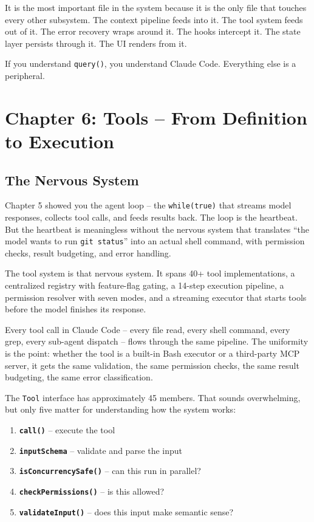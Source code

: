 \documentclass[
  english,
  11pt,
  letterpaper,
]{book}
\providecommand{\tightlist}{%
  \setlength{\itemsep}{0pt}\setlength{\parskip}{0pt}}
\begin{document}
It is the most important file in the system because it is the only file
that touches every other subsystem. The context pipeline feeds into it.
The tool system feeds out of it. The error recovery wraps around it. The
hooks intercept it. The state layer persists through it. The UI renders
from it.

If you understand \texttt{query()}, you understand Claude Code.
Everything else is a peripheral.

\chapter{Chapter 6: Tools -- From Definition to
Execution}\label{chapter-6-tools-from-definition-to-execution}

\section{The Nervous System}\label{the-nervous-system}

Chapter 5 showed you the agent loop -- the \texttt{while(true)} that
streams model responses, collects tool calls, and feeds results back.
The loop is the heartbeat. But the heartbeat is meaningless without the
nervous system that translates ``the model wants to run
\texttt{git\ status}'' into an actual shell command, with permission
checks, result budgeting, and error handling.

The tool system is that nervous system. It spans 40+ tool
implementations, a centralized registry with feature-flag gating, a
14-step execution pipeline, a permission resolver with seven modes, and
a streaming executor that starts tools before the model finishes its
response.

Every tool call in Claude Code -- every file read, every shell command,
every grep, every sub-agent dispatch -- flows through the same pipeline.
The uniformity is the point: whether the tool is a built-in Bash
executor or a third-party MCP server, it gets the same validation, the
same permission checks, the same result budgeting, the same error
classification.

The \texttt{Tool} interface has approximately 45 members. That sounds
overwhelming, but only five matter for understanding how the system
works:

\begin{enumerate}
\def\labelenumi{\arabic{enumi}.}
\tightlist
\item
  \textbf{\texttt{call()}} -- execute the tool
\item
  \textbf{\texttt{inputSchema}} -- validate and parse the input
\item
  \textbf{\texttt{isConcurrencySafe()}} -- can this run in parallel?
\item
  \textbf{\texttt{checkPermissions()}} -- is this allowed?
\item
  \textbf{\texttt{validateInput()}} -- does this input make semantic
  sense?
\end{enumerate}
\end{document}
